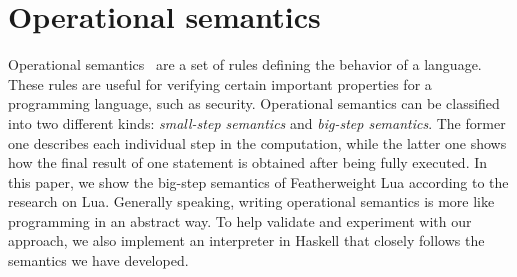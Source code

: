 \section{Operational semantics}
Operational semantics~\cite{AIOS} are a set of rules defining the behavior of a language.
These rules are useful for verifying certain important properties for a programming language, such as security. Operational semantics can be classified into two different kinds: \emph{small-step semantics} and \emph{big-step semantics}. The former one describes each individual step in the computation, while the latter one shows how the final result of one statement is obtained after being fully executed. In this paper, we show the big-step semantics of Featherweight Lua according to the research on Lua. Generally speaking, writing operational semantics is more like programming in an abstract way. To help validate and experiment with our approach, we also implement an interpreter in Haskell that closely follows the semantics we have developed.





